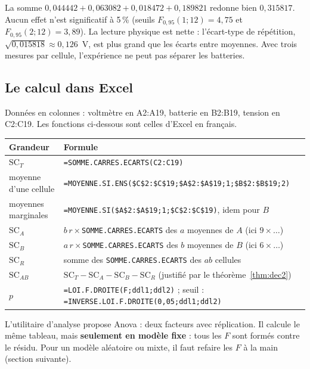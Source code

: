 \documentclass[11pt,a4paper]{article}
\theoremstyle{sj}
\theoremstyle{definition}
\theoremstyle{remark}
\newcommand{\SC}{\mathrm{SC}}
\providecommand{\og}{\guillemotleft\nobreakspace}
\providecommand{\fg}{\nobreakspace\guillemotright}
\newcommand{\nosp}[1]{{\XeTeXinterchartokenstate=0 #1}}
\begin{document}
La somme $0{,}044442+0{,}063082+0{,}018472+0{,}189821$ redonne bien $0{,}315817$. Aucun effet n'est significatif à 5\,\% (seuils $F_{0,95}(1;12)=4{,}75$ et $F_{0,95}(2;12)=3{,}89$). La lecture physique est nette : l'écart-type de répétition, $\sqrt{0{,}015818}\approx0{,}126$~V, est plus grand que les écarts entre moyennes. Avec trois mesures par cellule, l'expérience ne peut pas séparer les batteries.

\subsection{Le calcul dans Excel}

Données en colonnes : voltmètre en \nosp{A2:A19}, batterie en \nosp{B2:B19}, tension en \nosp{C2:C19}. Les fonctions ci-dessous sont celles d'Excel en français.

\begin{center}
\begin{tabularx}{\textwidth}{l X}
\toprule
\textbf{Grandeur} & \textbf{Formule}\\
\midrule
$\SC_T$ & \texttt{=SOMME.CARRES.ECARTS(C2:C19)}\\
moyenne d'une cellule & \texttt{=MOYENNE.SI.ENS(\$C\$2:\$C\$19;\$A\$2:\$A\$19;1;\$B\$2:\$B\$19;2)}\\
moyennes marginales & \texttt{=MOYENNE.SI(\$A\$2:\$A\$19;1;\$C\$2:\$C\$19)}, idem pour $B$\\
$\SC_A$ & $b\,r\times$\texttt{SOMME.CARRES.ECARTS} des $a$ moyennes de $A$ (ici $9\times\dots$)\\
$\SC_B$ & $a\,r\times$\texttt{SOMME.CARRES.ECARTS} des $b$ moyennes de $B$ (ici $6\times\dots$)\\
$\SC_R$ & somme des \texttt{SOMME.CARRES.ECARTS} des $ab$ cellules\\
$\SC_{AB}$ & $\SC_T-\SC_A-\SC_B-\SC_R$ (justifié par le théorème~\ref{thm:dec2})\\
$p$ & \texttt{=LOI.F.DROITE(F;ddl1;ddl2)} ; seuil : \texttt{=INVERSE.LOI.F.DROITE(0,05;ddl1;ddl2)}\\
\bottomrule
\end{tabularx}
\end{center}

L'utilitaire d'analyse propose \og Anova : deux facteurs avec réplication\fg{}. Il calcule le même tableau, mais \textbf{seulement en modèle fixe} : tous les $F$ sont formés contre le résidu. Pour un modèle aléatoire ou mixte, il faut refaire les $F$ à la main (section suivante).
\end{document}
